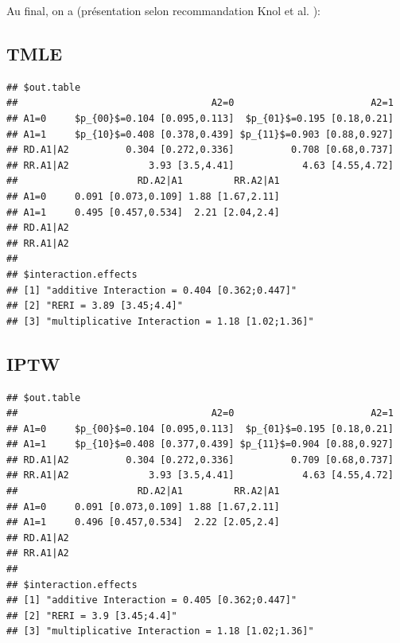 \documentclass[
]{book}
\begin{document}
Au final, on a (présentation selon recommandation Knol et al. \citet{knol_recommendations_2012}):

\hypertarget{tmle}{%
\subsection*{TMLE}\label{tmle}}

\begin{verbatim}
## $out.table
##                                  A2=0                        A2=1
## A1=0     $p_{00}$=0.104 [0.095,0.113]  $p_{01}$=0.195 [0.18,0.21]
## A1=1     $p_{10}$=0.408 [0.378,0.439] $p_{11}$=0.903 [0.88,0.927]
## RD.A1|A2          0.304 [0.272,0.336]          0.708 [0.68,0.737]
## RR.A1|A2              3.93 [3.5,4.41]            4.63 [4.55,4.72]
##                     RD.A2|A1         RR.A2|A1
## A1=0     0.091 [0.073,0.109] 1.88 [1.67,2.11]
## A1=1     0.495 [0.457,0.534]  2.21 [2.04,2.4]
## RD.A1|A2                                     
## RR.A1|A2                                     
## 
## $interaction.effects
## [1] "additive Interaction = 0.404 [0.362;0.447]"   
## [2] "RERI = 3.89 [3.45;4.4]"                       
## [3] "multiplicative Interaction = 1.18 [1.02;1.36]"
\end{verbatim}

\hypertarget{iptw}{%
\subsection*{IPTW}\label{iptw}}

\begin{verbatim}
## $out.table
##                                  A2=0                        A2=1
## A1=0     $p_{00}$=0.104 [0.095,0.113]  $p_{01}$=0.195 [0.18,0.21]
## A1=1     $p_{10}$=0.408 [0.377,0.439] $p_{11}$=0.904 [0.88,0.927]
## RD.A1|A2          0.304 [0.272,0.336]          0.709 [0.68,0.737]
## RR.A1|A2              3.93 [3.5,4.41]            4.63 [4.55,4.72]
##                     RD.A2|A1         RR.A2|A1
## A1=0     0.091 [0.073,0.109] 1.88 [1.67,2.11]
## A1=1     0.496 [0.457,0.534]  2.22 [2.05,2.4]
## RD.A1|A2                                     
## RR.A1|A2                                     
## 
## $interaction.effects
## [1] "additive Interaction = 0.405 [0.362;0.447]"   
## [2] "RERI = 3.9 [3.45;4.4]"                        
## [3] "multiplicative Interaction = 1.18 [1.02;1.36]"
\end{verbatim}
\end{document}
